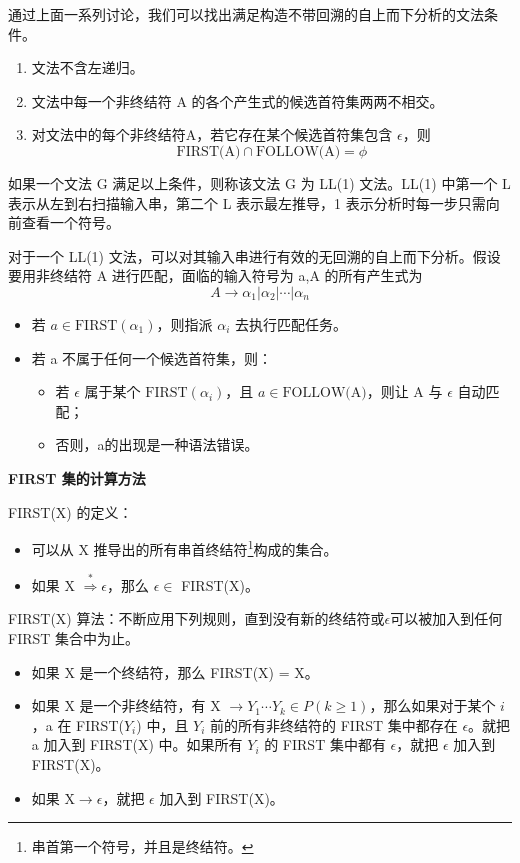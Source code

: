 通过上面一系列讨论，我们可以找出满足构造不带回溯的自上而下分析的文法条件。
\begin{enumerate}
    \item 文法不含左递归。
    \item 文法中每一个非终结符 A 的各个产生式的候选首符集两两不相交。
    \item 对文法中的每个非终结符A，若它存在某个候选首符集包含 $\epsilon$，则
          \[ \text{FIRST(A)} \cap \text{FOLLOW(A)} = \phi \]
\end{enumerate}
如果一个文法 G 满足以上条件，则称该文法 G 为 LL(1) 文法。LL(1) 中第一个 L 表示从左到右扫描输入串，第二个 L 表示最左推导，1 表示分析时每一步只需向前查看一个符号。

对于一个 LL(1) 文法，可以对其输入串进行有效的无回溯的自上而下分析。假设要用非终结符 A 进行匹配，面临的输入符号为 a,A 的所有产生式为
\[ A \rightarrow \alpha_1 | \alpha_2 | \cdots | \alpha_n \]
\begin{itemize}
    \item 若 $a\in \text{FIRST}(\alpha_1)$，则指派 $\alpha_i$ 去执行匹配任务。
    \item 若 a 不属于任何一个候选首符集，则：
          \begin{itemize}
              \item 若 $\epsilon$ 属于某个 $\text{FIRST}(\alpha_i)$，且 $a\in \text{FOLLOW(A)}$，则让 A 与 $\epsilon$ 自动匹配；
              \item 否则，a的出现是一种语法错误。
          \end{itemize}
\end{itemize}

\noindent\textbf{FIRST 集的计算方法}

FIRST(X) 的定义：
\begin{itemize}
    \item 可以从 X 推导出的所有串首终结符\footnote{串首第一个符号，并且是终结符。}构成的集合。
    \item 如果 X $\stackrel{*}{\Rightarrow} \epsilon$，那么 $\epsilon \in$ FIRST(X)。
\end{itemize}

FIRST(X) 算法：不断应用下列规则，直到没有新的终结符或$\epsilon$可以被加入到任何 FIRST 集合中为止。
\begin{itemize}
    \item 如果 X 是一个终结符，那么 FIRST(X) = X。
    \item 如果 X 是一个非终结符，有 X $\rightarrow Y_1 \cdots Y_k \in P (k\geq 1) $，那么如果对于某个 $i$，a 在 FIRST($Y_i$) 中，且 $Y_i$ 前的所有非终结符的 FIRST 集中都存在 $\epsilon$。就把 a 加入到 FIRST(X) 中。如果所有 $Y_i$ 的 FIRST 集中都有 $\epsilon$，就把 $\epsilon$ 加入到 FIRST(X)。
    \item 如果 X$\rightarrow \epsilon$，就把 $\epsilon$ 加入到 FIRST(X)。
\end{itemize}

\newpage